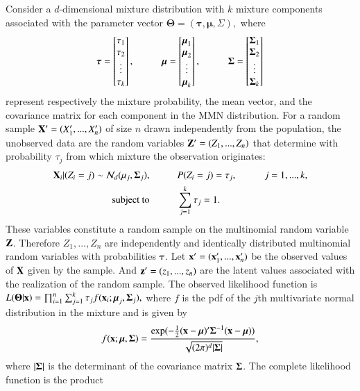 \documentclass[10pt]{amsart}
\newcommand\tab[1][1cm]{\hspace*{#1}}
\begin{document}
Consider a $d$-dimensional mixture distribution with $k$ mixture components associated with the parameter vector $\boldsymbol{\Theta}=(\boldsymbol{\tau},\boldsymbol{\mu},\Sigma),$ where 
\[
\boldsymbol{\tau}=\begin{bmatrix} 
\tau_1 \\ \tau_2 \\ \vdots \\ \tau_k
\end{bmatrix},\tab
\boldsymbol{\mu}=\begin{bmatrix}
\boldsymbol{\mu}_1 \\ \boldsymbol{\mu}_2 \\ \vdots \\ \boldsymbol{\mu}_k
\end{bmatrix},\tab
{\bf \Sigma}=\begin{bmatrix}
{\bf \Sigma}_1 \\ {\bf \Sigma}_2 \\ \vdots \\ {\bf \Sigma}_k
\end{bmatrix}
\] represent respectively the mixture probability, the mean vector, and the covariance matrix for each component in the MMN distribution.
For a random sample ${\bf X}'=(X_1',...,X_n')$ of size $n$ drawn independently from the population, the unobserved data are the random variables ${\bf Z}'=(Z_1,...,Z_n)$ that determine with probability $\tau_j$ from which mixture the observation originates: 
\[
\begin{split}
    {\bf X}_i|(Z_i=j)\sim \mathcal{N}_d(\mu_j,{\bf\Sigma}_j),&\tab P(Z_i=j)=\tau_j,\tab j=1,...,k,\\
    \text{ subject to}&\tab \sum_{j=1}^k \tau_j =1.
\end{split}
\]
These variables constitute a random sample on the multinomial random variable ${\bf Z}$. Therefore $Z_1,...,Z_n$ are independently and identically distributed multinomial random variables with probabilities $\boldsymbol{\tau}.$ Let ${\bf x}'=({\bf x}_1',...,{\bf x}_n')$ be the observed values of ${\bf X}$ given by the sample. And ${\bf z}'=(z_1,...,z_n)$ are the latent values associated with the realization of the random sample. The observed likelihood function is $L({\bf \Theta}|{\bf x})=\prod_{i=1}^n \sum_{j=1}^k \tau_j f({\bf x}_i;\boldsymbol{\mu}_j, \boldsymbol{\Sigma}_j),$ where $f$ is the pdf of the $j$th multivariate normal distribution in the mixture and is given by $$f({\bf x};\boldsymbol{\mu},\boldsymbol{\Sigma})=\frac{\exp(-\frac{1}{2}({\bf x}-\boldsymbol{\mu})'\boldsymbol{\Sigma}^{-1}({\bf x}-\boldsymbol{\mu}))}{\sqrt{(2\pi)^d|\boldsymbol{\Sigma}|}},$$ where $|{\bf \Sigma}|$ is the determinant of the covariance matrix ${\bf \Sigma}$. The complete likelihood function is the product 
\end{document}
